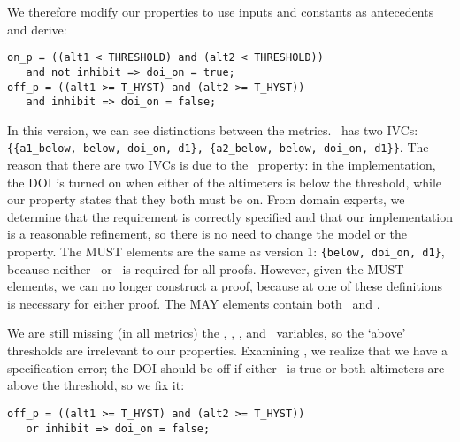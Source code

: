 
We therefore modify our properties to use inputs and constants as antecedents and derive:

{\smaller
\begin{verbatim}
on_p = ((alt1 < THRESHOLD) and (alt2 < THRESHOLD))
   and not inhibit => doi_on = true;
off_p = ((alt1 >= T_HYST) and (alt2 >= T_HYST))
   and inhibit => doi_on = false;
\end{verbatim}
}

\noindent In this version, we can see distinctions between the metrics.  \allp\ has two IVCs: \texttt{\{\{a1\_below, below, doi\_on, d1\}, \{a2\_below, below, doi\_on, d1\}\}}.  The reason that there are two IVCs is due to the \onp\ property: in the implementation, the DOI is turned on when either of the altimeters is below the threshold, while our property states that they both must be on.
From domain experts, we determine that the requirement is correctly specified and that our implementation is a reasonable refinement, so there is no need to change the model or the property.  The MUST elements are the same as version 1: \texttt{\{below, doi\_on, d1\}}, because neither \aonebelow\ or \atwobelow\ is required for all proofs.  However, given the MUST elements, we can no longer construct a proof, because at one of these definitions is necessary for either proof.  The MAY elements contain both \aonebelow\ and \atwobelow.

We are still missing (in all metrics) the \abovehyst, \aoneabove, \atwoabove, and \dtwo\ variables, so the `above' thresholds are irrelevant to our properties.  Examining \offp, we realize that we have a specification error; the DOI should be off if either \inhibit\ is true or both altimeters are above the threshold, so we fix it:

{\smaller
\begin{verbatim}
off_p = ((alt1 >= T_HYST) and (alt2 >= T_HYST))
   or inhibit => doi_on = false;
\end{verbatim}
}


